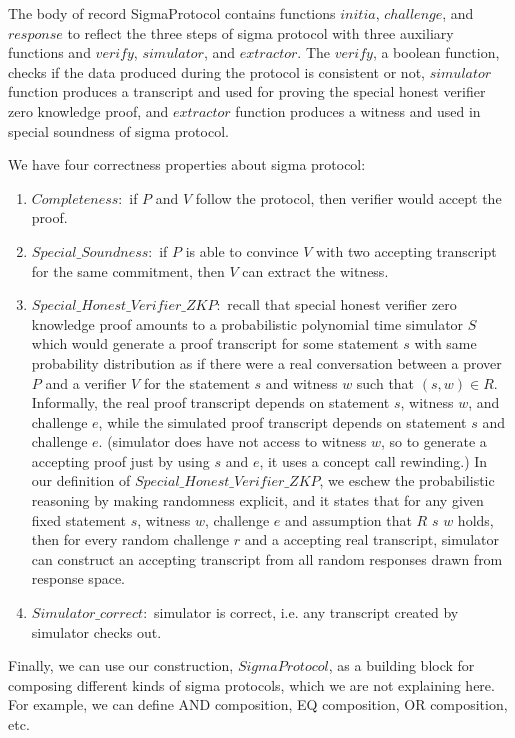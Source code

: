 \noindent
The body of record SigmaProtocol contains
functions $initia$,  $challenge$, and $response$
to reflect the three steps of sigma protocol with three auxiliary 
functions  and $verify$,  $simulator$, and $extractor$.  
The  $verify$, a boolean  function, checks if the data produced 
during the protocol is consistent or not, $simulator$ function produces 
a transcript and used for proving the special honest verifier zero knowledge proof, 
and $extractor$ function produces a witness  and used in special soundness of 
sigma protocol. 

\noindent
We have four correctness properties about sigma protocol:
\begin{enumerate}
\item $Completeness:$ if $P$ and $V$ follow the protocol, then 
verifier would accept the proof. 
\item $Special\_Soundness:$ if $P$ is able to convince $V$ with two 
accepting transcript for the same commitment, then $V$ can extract the witness.
\item $Special\_Honest\_Verifier\_ZKP:$ recall that  special honest 
verifier zero knowledge proof amounts to a probabilistic polynomial time simulator 
$S$ which would generate a proof transcript for some statement 
$s$  with same probability distribution as if there were a real 
conversation between a prover $P$ and a verifier $V$ 
for the statement $s$ and witness $w$ such that $(s, w) \in  R$.
Informally, the real proof transcript depends on statement $s$, witness $w$,  
and challenge $e$,  while the simulated proof transcript depends on statement $s$ and challenge $e$. 
(simulator does have not access to witness $w$, so to generate a accepting 
proof just by using $s$ and $e$, it uses a concept call rewinding.)
In our definition of $Special\_Honest\_Verifier\_ZKP$, we eschew the 
probabilistic reasoning by making randomness explicit, and it
states that for any  given 
fixed statement $s$, witness $w$, challenge $e$ and assumption that $R$ $s$ $w$ holds, 
then for every random challenge $r$  and a accepting real transcript, simulator can construct 
an accepting transcript from all random responses drawn from response space. 
\item $Simulator\_correct:$ simulator is correct,  i.e. any transcript created by simulator checks out. 

\end{enumerate}
 


Finally, we can use our construction,  $SigmaProtocol$, as a building block 
for composing different kinds of sigma protocols, which we are not explaining 
here.  For example,  we can define AND composition, EQ composition, OR composition, etc.


